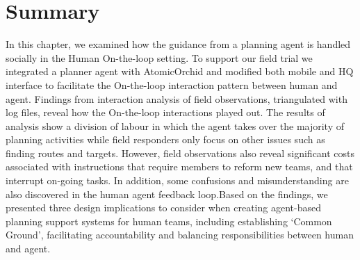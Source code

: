 
\section{Summary}

In this chapter, we examined how the guidance from a planning agent is handled socially in the Human On-the-loop setting. To support our field trial we integrated a planner agent with AtomicOrchid and modified both mobile and HQ interface to facilitate the On-the-loop interaction pattern between human and agent. Findings from interaction analysis of field observations, triangulated with log files, reveal how the On-the-loop interactions played out. The results of analysis show a division of labour in which the agent takes over the majority of planning activities while field responders only focus on other issues such as finding routes and targets. However, field observations also reveal significant costs associated with instructions that require members to reform new teams, and that interrupt on-going tasks. In addition, some confusions and misunderstanding are also discovered in the human agent feedback loop.Based on the findings, we presented three design implications to consider when creating agent-based planning support systems for human teams, including establishing `Common Ground', facilitating accountability and balancing responsibilities between human and agent.\\


